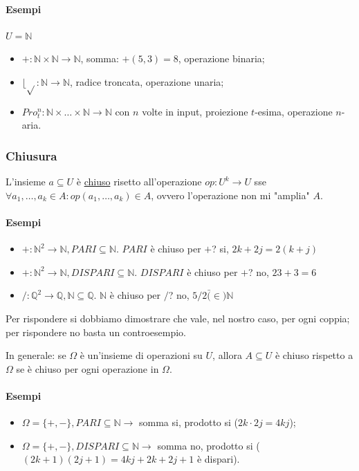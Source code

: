 \documentclass{article}
\begin{document}
\paragraph{Esempi} $U=\mathbb{N}$
\begin{itemize}
	\item $+:\mathbb{N} \times \mathbb{N} \rightarrow \mathbb{N}$, somma: $+(5,3)=8$, operazione binaria;
	\item $\lfloor \sqrt{} : \mathbb{N} \rightarrow \mathbb{N}$, radice troncata, operazione unaria;
	\item $Pro_t^n: \mathbb{N} \times \dots \times \mathbb{N} \rightarrow \mathbb{N}$ con $n$ volte in input, proiezione $t$-esima, operazione $n$-aria.
\end{itemize}
\subsubsection{Chiusura}
L'insieme $a \subseteq U$ è \underline{chiuso} risetto all'operazione $op:U^k \rightarrow U$ sse $\forall a_1, \dots, a_k \in A: op(a_1, \dots, a_k) \in A$, ovvero l'operazione non mi "amplia" $A$.
\paragraph{Esempi}
\begin{itemize}
	\item $+: \mathbb{N}^2 \rightarrow \mathbb{N}, PARI \subseteq \mathbb{N}$. $PARI$ è chiuso per $+$? si, $2k + 2j =2(k+j)$
	\item $+: \mathbb{N}^2 \rightarrow \mathbb{N}, DISPARI \subseteq \mathbb{N}$. $DISPARI$ è chiuso per $+$? no, $23+3=6$
	\item $/: \mathbb{Q}^2 \rightarrow \mathbb{Q}, \mathbb{N} \subseteq \mathbb{Q}$. $\mathbb{N}$ è chiuso per $/$? no, $5/2 \bar(\in) \mathbb{N}$
\end{itemize}
Per rispondere si dobbiamo dimostrare che vale, nel nostro caso, per ogni coppia; per rispondere no basta un controesempio.




In generale: se $\Omega$ è un'insieme di operazioni su $U$, allora $A \subseteq U$ è chiuso rispetto a $\Omega$ se è chiuso per ogni operazione in $\Omega$.
\paragraph{Esempi}
\begin{itemize}
	\item $\Omega = \{ +, - \}, PARI \subseteq \mathbb{N} \rightarrow$ somma si, prodotto si ($2k \cdot 2j = 4kj$);
	\item $\Omega = \{ +, - \}, DISPARI \subseteq \mathbb{N} \rightarrow$ somma no, prodotto si ( $(2k+1)  (2j+1) = 4kj+2k+2j+1$ è dispari).
\end{itemize}
\end{document}
